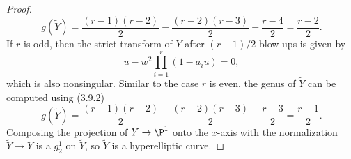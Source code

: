 \documentclass[a4paper]{article}
\begin{document}
\begin{enumerate} [label=\textbf{\arabic*.}, leftmargin=0em]
\begin{proof}
              \begin{equation*}
                  g(\tilde{Y}) = \frac{(r-1)(r-2)}{2} -\frac{(r-2)(r-3)}{2} - \frac{r - 4}{2} =\boxed{\frac{r-2}{2}}.
              \end{equation*}
              If $r$ is odd, then the strict transform of $Y$ after $(r - 1)/2$ blow-ups is given by
              \begin{equation*}
                  u - w^2 \prod_{i = 1}^r (1 - a_i u) = 0,
              \end{equation*}
              which is also nonsingular.
              Similar to the case $r$ is even, the genus of $\tilde{Y}$ can be computed using (3.9.2)
              \begin{equation*}
                  g(\widetilde Y) =\frac{(r-1)(r-2)}2 -\frac{(r-2)(r-3)}2 -\frac{r-3}{2} =\boxed{\frac{r-1}{2}}.
              \end{equation*}
              Composing the projection of $Y \to \P^1$ onto the $x$-axis with the normalization $\tilde{Y} \to Y$ is a $g^1_2$ on $\tilde{Y}$, so $\tilde{Y}$ is a hyperelliptic curve.
          \end{proof}



\end{enumerate}
\end{document}
